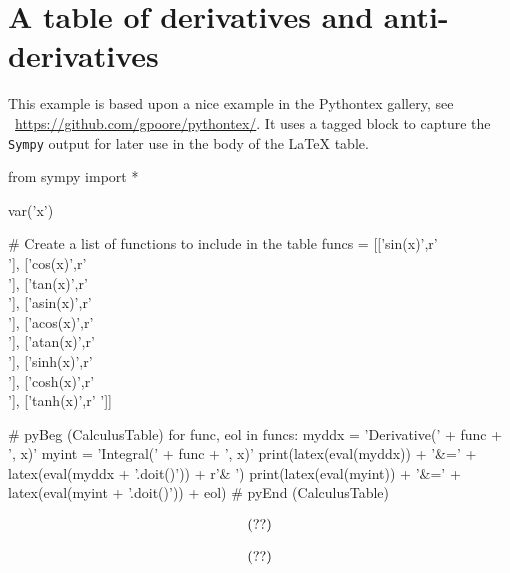 \documentclass[12pt]{pylatex}
\begin{document}
\section*{A table of derivatives and anti-derivatives}

This example is based upon a nice example in the Pythontex gallery, see
\ \url{https://github.com/gpoore/pythontex/}.
It uses a tagged block to capture the {\tt\small Sympy} output for later use
in the body of the LaTeX table.

\lstset{numbers=left}

\begin{minipage}[t]{0.72\textwidth}
\begin{python}
   from sympy import *

   var('x')

   # Create a list of functions to include in the table
   funcs = [['sin(x)',r'\\'],       ['cos(x)',r'\\'],       ['tan(x)',r'\\'],
            ['asin(x)',r'\\[5pt]'], ['acos(x)',r'\\[5pt]'], ['atan(x)',r'\\[5pt]'],
            ['sinh(x)',r'\\'],      ['cosh(x)',r'\\'],      ['tanh(x)',r' ']]

   # pyBeg (CalculusTable)
   for func, eol in funcs:
       myddx = 'Derivative(' + func + ', x)'
       myint = 'Integral(' + func + ', x)'
       print(latex(eval(myddx)) + '&=' + latex(eval(myddx + '.doit()')) + r'\quad & \quad')
       print(latex(eval(myint)) + '&=' + latex(eval(myint + '.doit()')) + eol)
   # pyEnd (CalculusTable)
\end{python}
\end{minipage}
\hskip 1cm
\begin{minipage}[t]{0.28\textwidth}
\begin{latex}
   \begin{align*}
      \py {CalculusTable}
   \end{align*}
\end{latex}
\end{minipage}

\clearpage

\begin{align*}
   \py {CalculusTable}
\end{align*}
\end{document}
